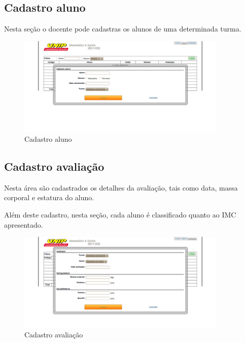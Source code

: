         \subsection{Cadastro aluno}

        Nesta seção o docente pode cadastras os alunos de uma determinada turma.

        \begin{figure}[htb]
            \centering
            \includegraphics[width=10cm]{programa/media/image/cadastro_aluno.png}
            \caption{Cadastro aluno}
            \label{fig:cad_aluno}
        \end{figure}

        \subsection{Cadastro avaliação}

        Nesta área são cadastrados os detalhes da avaliação, tais como data,
        massa corporal e estatura do aluno.

        Além deste cadastro, nesta seção, cada aluno é classificado quanto ao
        IMC apresentado.

        \begin{figure}[htb]
            \centering
            \includegraphics[width=10cm]{programa/media/image/cadastro_avaliacao.png}
            \caption{Cadastro avaliação}
            \label{fig:cad_avaliacao}
        \end{figure}
